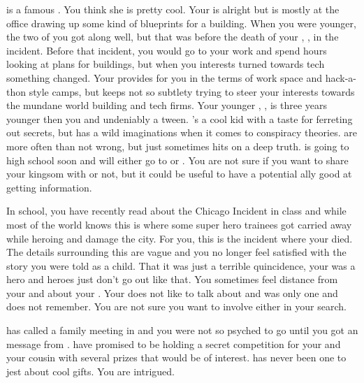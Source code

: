 \documentclass[char]{LRSguildcamp1}
\begin{document}
\cGrandma{} is a famous \cGrandma{\villain}. You think she is pretty cool. Your \cArchitect{\parent} is alright but is mostly at the office drawing up some kind of blueprints for a building. When you were younger, the two of you got along well, but that was before the death of your \cAS{\parent}, \cAS{}, in the \pCityO{} incident. Before that incident, you would go to your \cArchitect{\parent} work and spend hours looking at plans for buildings, but when you interests turned towards tech something changed. Your \cArchitect{\parent} provides for you in the terms of work space and hack-a-thon style camps, but keeps not so subtlety trying to steer your interests towards the mundane world building and tech firms. Your younger \cTween{\sibling}, \cTween{}, is three years younger then you and undeniably a tween. \cTween{}'s a cool kid with a taste for ferreting out secrets, but has a wild imaginations when it comes to conspiracy theories. \cTween{\they} are more often than not wrong, but just sometimes hits on a deep truth. \cTween{} is going to high school soon and will either go to \pNormalSchool{} or \pSuperSchool{}. You are not sure if you want to share your kingsom with \cTween{\them} or not, but it could be useful to have a potential ally good at getting information. 

In school, you have recently read about the Chicago Incident in class and while most of the world knows this is where some super hero trainees got carried away while heroing and damage the city. For you, this is the incident where your \cAS{\parent} died. The details surrounding this are vague and you no longer feel satisfied with the story you were told as a child. That it was just a terrible quincidence, your \cAS{} was a hero and heroes just don't go out like that. You sometimes feel distance from your\cArchitect{\parent} and \cTween{} about your \cAS{\parent}. Your \cArchitect{\parent} does not like to talk about \cAS{} and \cTween{} was only one and does not remember. You are not sure you want to involve either in your search.

\cGrandma{} has called a family meeting in \pCityGrandma{} and you were not so psyched to go until you got an message from \cGrandma{}. \cGrandma{\they} have promised to be holding a secret competition for your and your cousin with several prizes that would be of interest. \cGrandma{} has never been one to jest about cool gifts. You are intrigued.  
\end{document}
